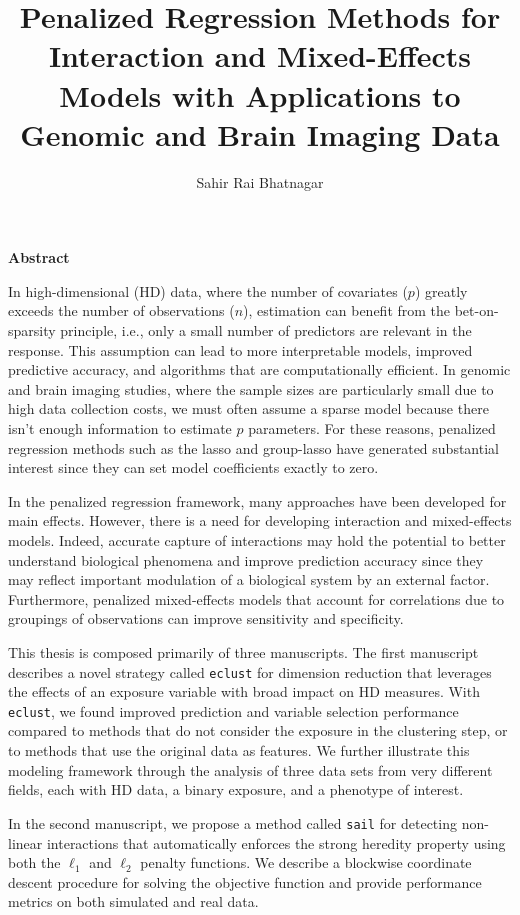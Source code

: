 \documentclass[]{article}
\title{Penalized Regression Methods for Interaction and Mixed-Effects Models with Applications to Genomic and Brain Imaging Data}
\author{Sahir Rai Bhatnagar}
\begin{document}
\maketitle


\begin{center}
	\textbf{\large Abstract}
\end{center}

In high-dimensional (HD) data, where the number of covariates ($p$) greatly exceeds the number of observations ($n$), estimation can benefit from the bet-on-sparsity principle, i.e., only a small number of predictors are relevant in the response. This assumption can lead to more interpretable models, improved predictive accuracy, and algorithms that are computationally efficient. In genomic and brain imaging studies, where the sample sizes are particularly small due to high data collection costs, we must often assume a sparse model because there isn't enough information to estimate $p$ parameters. For these reasons, penalized regression methods such as the lasso and group-lasso have generated substantial interest since they can set model coefficients exactly to zero. 

In the penalized regression framework, many approaches have been developed for main effects. However, there is a need for developing interaction and mixed-effects models. Indeed,  
accurate capture of interactions may hold the potential to better understand biological phenomena and improve prediction accuracy since they may reflect important modulation of a biological system by an external factor. Furthermore, penalized mixed-effects models that account for correlations due to groupings of observations can improve sensitivity and specificity. 

This thesis is composed primarily of three manuscripts. The first manuscript describes a novel strategy called \texttt{eclust} for dimension reduction that leverages the effects of an exposure variable with broad impact on HD measures. With \texttt{eclust}, we found improved prediction and variable selection performance compared to methods that do not consider the exposure in the clustering step, or to methods that use the original data as features. We further illustrate this modeling framework through the analysis of three data sets from very different fields, each with HD data, a binary exposure, and a phenotype of interest.

In the second manuscript, we propose a method called \texttt{sail} for detecting non-linear interactions that automatically enforces the strong heredity property using both the $\ell_1$ and $\ell_2$ penalty functions. We describe a blockwise coordinate descent procedure for solving the objective function and provide performance metrics on both simulated and real data. 
\end{document}
